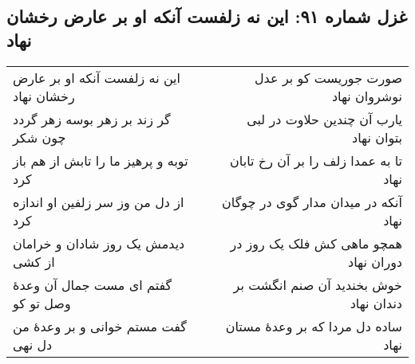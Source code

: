 \begin{center}
\section*{غزل شماره ۹۱: این نه زلفست آنکه او بر عارض رخشان نهاد}
\label{sec:091}
\begin{longtable}{l p{0.5cm} r}
این نه زلفست آنکه او بر عارض رخشان نهاد
&&
صورت جوریست کو بر عدل نوشروان نهاد
\\
گر زند بر زهر بوسه زهر گردد چون شکر
&&
یارب آن چندین حلاوت در لبی بتوان نهاد
\\
توبه و پرهیز ما را تابش از هم باز کرد
&&
تا به عمدا زلف را بر آن رخ تابان نهاد
\\
از دل من وز سر زلفین او اندازه کرد
&&
آنکه در میدان مدار گوی در چوگان نهاد
\\
دیدمش یک روز شادان و خرامان از کشی
&&
همچو ماهی کش فلک یک روز در دوران نهاد
\\
گفتم ای مست جمال آن وعدهٔ وصل تو کو
&&
خوش بخندید آن صنم انگشت بر دندان نهاد
\\
گفت مستم خوانی و بر وعدهٔ من دل نهی
&&
ساده دل مردا که بر وعدهٔ مستان نهاد
\\
\end{longtable}
\end{center}
